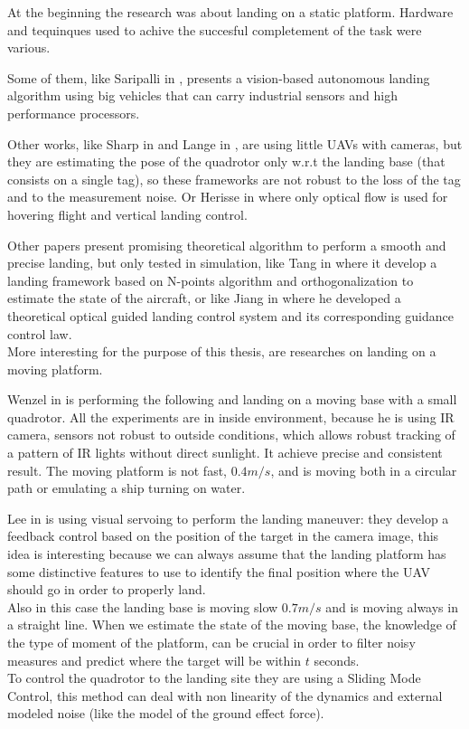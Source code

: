 At the beginning the research was about landing on a static platform. Hardware and tequinques used to achive the succesful completement of the task were various.

Some of them, like Saripalli in \cite{saripalli2002vision}, presents a vision-based autonomous landing algorithm using big vehicles that can carry industrial sensors and high performance processors.

Other works, like Sharp in \cite{sharp2001vision} and Lange in \cite{lange2008autonomous}, are using little UAVs with cameras, but they are estimating the pose of the quadrotor only w.r.t the landing base (that consists on a single tag), so these frameworks are not robust to the loss of the tag and to the measurement noise. Or Herisse in \cite{herisse2008hovering} where only optical flow is used for hovering flight and vertical landing control.

Other papers present promising theoretical algorithm to perform a smooth and precise landing, but only tested in simulation, like Tang in \cite{tang2011uav} where it develop a landing framework based on N-points algorithm and orthogonalization to estimate the state of the aircraft, or like Jiang in \cite{jian2012automatic} where he developed a theoretical optical guided landing control system and its corresponding guidance control law.\\


More interesting for the purpose of this thesis, are researches on landing on a moving platform.

Wenzel in \cite{wenzel2011automatic} is performing the following and landing on a moving base with a small quadrotor. All the experiments are in inside environment, because he is using IR camera, sensors not robust to outside conditions, which allows robust tracking of a pattern of IR lights without direct sunlight. It achieve precise and consistent result. The moving platform is not fast, $0.4m/s$, and is moving both in a circular path or emulating a ship turning on water.

Lee in \cite{lee2012autonomous} is using visual servoing to perform the landing maneuver: they develop a feedback control based on the position of the target in the camera image, this idea is interesting because we can always assume that the landing platform has some distinctive features to use to identify the final position where the UAV should go in order to properly land.\\
Also in this case the landing base is moving slow $0.7m/s$ and is moving always in a straight line. When we estimate the state of the moving base, the knowledge of the type of moment of the platform, can be crucial in order to filter noisy measures and predict where the target will be within $t$ seconds.\\
To control the quadrotor to the landing site they are using a Sliding Mode Control, this method can deal with non linearity of the dynamics and external modeled noise (like the model of the ground effect force).

